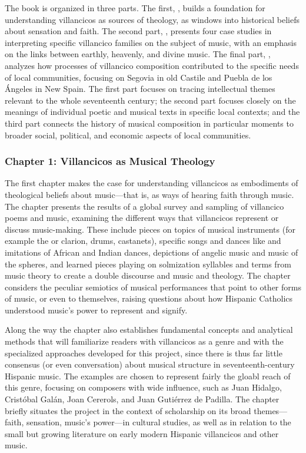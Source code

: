 \documentclass[tt]{vcbook-proposal}
\begin{document}
The book is organized in three parts.
The first, , builds a foundation for understanding villancicos as sources of theology, as windows into historical beliefs about sensation and faith.
The second part, , presents four case studies in interpreting specific villancico families on the subject of music, with an emphasis on the links between earthly, heavenly, and divine music.
The final part, , analyzes how processes of villancico composition contributed to the specific needs of local communities, focusing on Segovia in old Castile and Puebla de los Ángeles in New Spain.
The first part focuses on tracing intellectual themes relevant to the whole seventeenth century; the second part focuses closely on the meanings of individual poetic and musical texts in specific local contexts; and the third part connects the history of musical composition in particular moments to broader social, political, and economic aspects of local communities.

\subsubsection{Chapter 1: Villancicos as Musical Theology}

The first chapter makes the case for understanding villancicos as embodiments of theological beliefs about music---that is, as ways of hearing faith through music.
The chapter presents the results of a global survey and sampling of villancico poems and music, examining the different ways that villancicos represent or discuss music-making.
These include pieces on topics of musical instruments (for example the  or clarion, drums, castanets), specific songs and dances like  and imitations of African and Indian dances, depictions of angelic music and music of the spheres, and learned pieces playing on solmization syllables and terms from music theory to create a double discourse and music and theology.
The chapter considers the peculiar semiotics of musical performances that point to other forms of music, or even to themselves, raising questions about how Hispanic Catholics understood music's power to represent and signify.

Along the way the chapter also establishes fundamental concepts and analytical methods that will familiarize readers with villancicos as a genre and with the specialized approaches developed for this project, since there is thus far little consensus (or even conversation) about musical structure in seventeenth-century Hispanic music.
The examples are chosen to represent fairly the gloabl reach of this genre, focusing on composers with wide influence, such as Juan Hidalgo, Cristóbal Galán, Joan Cererols, and Juan Gutiérrez de Padilla.
The chapter briefly situates the project in the context of scholarship on its broad themes---faith, sensation, music's power---in cultural studies, as well as in relation to the small but growing literature on early modern Hispanic villancicos and other music.
\end{document}
